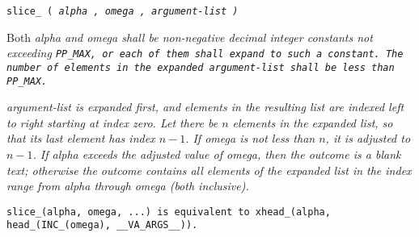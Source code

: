 
\tt{slice_ (} \it{alpha} \tt{,} \it{omega} \tt{,} \it{argument-list} \tt{)}


Both \it{alpha} and \it{omega} shall be non-negative decimal integer constants
not exceeding \tt{PP_MAX}, or each of them shall expand to such a constant.
The number of elements in the expanded
\it{argument-list} shall be less than \tt{PP_MAX}.


\it{argument-list} is expanded first, and elements in the
resulting list are indexed left to right starting at index zero.
Let there be $n$ elements in the expanded list,
so that its last element has index $n - 1$.
If \it{omega} is not less than $n$, it is adjusted to $n - 1$.
If \it{alpha} exceeds the adjusted value of \it{omega},
then the outcome is a blank text;
otherwise the outcome contains all elements of the expanded list in
the index range from \it{alpha} through \it{omega} (both inclusive).

\note \tt{slice_(alpha, omega, ...)} is equivalent to
\tt{xhead_(alpha, head_(INC_(omega), __VA_ARGS__))}.
